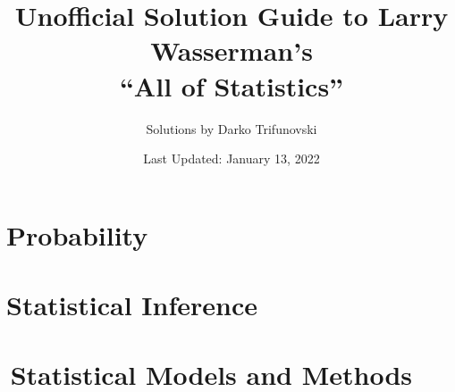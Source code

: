 \documentclass[oneside, 11pt, letterpaper]{memoir}
\title{Unofficial Solution Guide to Larry Wasserman's \\
      ``All of Statistics''}
\author{Solutions by Darko Trifunovski}
\date{Last Updated: January 13, 2022}
\theoremstyle{definition}
\begin{document}
\frontmatter
\begin{titlingpage}
  \maketitle
\end{titlingpage}
\tableofcontents

\mainmatter
\part{Probability}






\part{Statistical Inference}








\part{\,Statistical Models and Methods}












\end{document}
